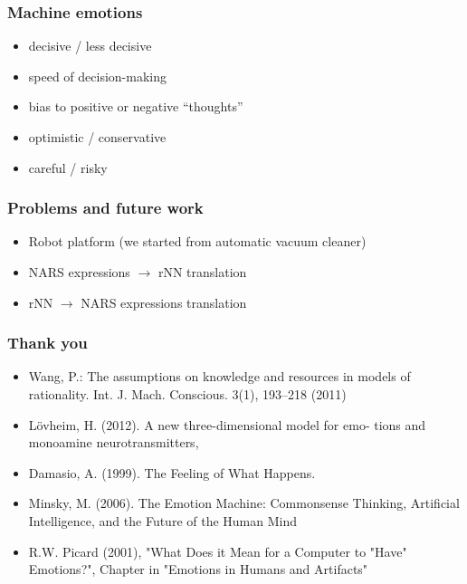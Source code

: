 \documentclass[12pt, aspectratio=169]{beamer}
\begin{document}

\begin{frame}
\frametitle{Machine emotions}
\begin{itemize}
 \item decisive / less decisive
 \item speed of decision-making
 \item bias to positive or negative ``thoughts''
 \item optimistic / conservative
 \item careful / risky
\end{itemize}
\end{frame}



\begin{frame}
\frametitle{Problems and future work}
\begin{itemize}
 \item Robot platform (we started from automatic vacuum cleaner)
 \item NARS expressions $\rightarrow$ rNN translation
 \item rNN $\rightarrow$ NARS expressions translation
\end{itemize}
\end{frame}


\begin{frame}
\frametitle{Thank you}

\begin{itemize}
\item Wang, P.: The assumptions on knowledge and resources in models of rationality. Int. J. Mach. Conscious. 3(1), 193–218 (2011)
\item L\"{o}vheim, H. (2012). A new three-dimensional model for emo- tions and monoamine neurotransmitters,
\item Damasio, A. (1999). The Feeling of What Happens.
\item Minsky, M. (2006). The Emotion Machine: Commonsense Thinking, Artificial Intelligence, and the Future of the Human Mind
\item R.W. Picard (2001), "What Does it Mean for a Computer to "Have" Emotions?", Chapter in "Emotions in Humans and Artifacts" 
\end{itemize}

\end{frame}

\end{document}
